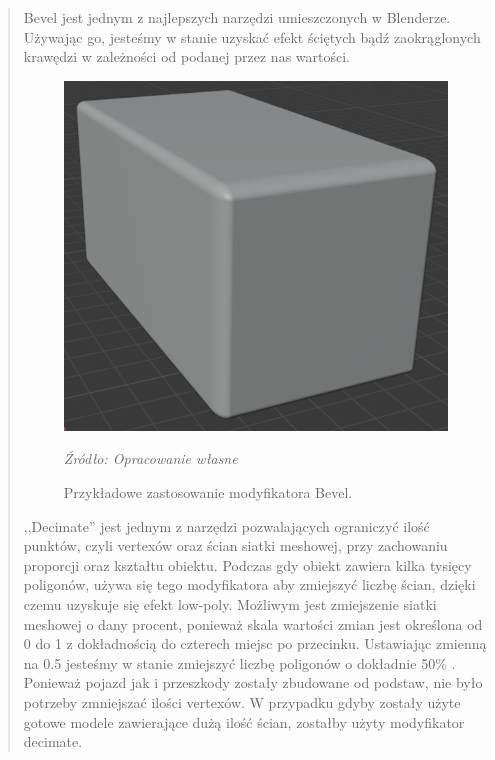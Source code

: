 \begin{quotation}
\indent Bevel jest jednym z najlepszych narzędzi umieszczonych w Blenderze. Używając go, jesteśmy w stanie uzyskać efekt ściętych bądź zaokrąglonych krawędzi w zależności od podanej przez nas wartości.

\begin{figure}[!hbt]
\centering
  \includegraphics[width=0.7\linewidth]{bevel.png}
  \caption{Przykładowe zastosowanie modyfikatora Bevel.}\label{rys_7}
  \begin{minipage}[t]{0.75\linewidth}
    \emph{Źródło: Opracowanie własne}
  \end{minipage}
\end{figure}

\newpage
\indent ,,Decimate'' jest jednym z narzędzi pozwalających ograniczyć ilość punktów, czyli vertexów oraz ścian siatki meshowej, przy zachowaniu proporcji oraz kształtu obiektu. Podczas gdy obiekt zawiera kilka tysięcy poligonów, używa się tego modyfikatora aby zmiejszyć liczbę ścian, dzięki czemu uzyskuje się efekt low-poly. Możliwym jest zmiejszenie siatki meshowej o dany procent, ponieważ skala wartości zmian jest określona od 0 do 1 z dokładnością do czterech miejsc po przecinku. Ustawiając zmienną na 0.5 jesteśmy w stanie zmiejszyć liczbę poligonów o dokładnie 50\% \cite{3}.  Ponieważ pojazd jak i przeszkody zostały zbudowane od podstaw, nie było potrzeby zmniejszać ilości vertexów. W przypadku gdyby zostały użyte gotowe modele zawierające dużą ilość ścian, zostałby użyty modyfikator decimate.


\end{quotation}
